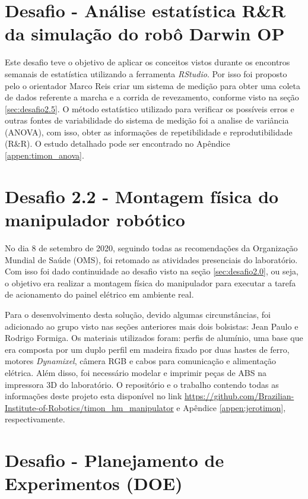 \section{Desafio - Análise estatística R\&R da simulação do robô Darwin OP}
\label{sec:estudo_estatisticoRR}

Este desafio teve o objetivo de aplicar os conceitos vistos durante os encontros semanais de estatística utilizando a ferramenta \textit{RStudio}. Por isso foi proposto pelo o orientador Marco Reis criar um sistema de medição para obter uma coleta de dados referente a marcha e a corrida de revezamento, conforme visto na seção \ref{sec:desafio2.5}. O método estatístico utilizado para verificar os possíveis erros e outras fontes de variabilidade do sistema de medição foi a analise de variância (ANOVA), com isso, obter as informações de repetibilidade e reprodutibilidade (R\&R). O estudo detalhado pode ser encontrado no Apêndice \ref{appen:timon_anova}. 


\section{Desafio 2.2 - Montagem física do manipulador robótico}
\label{sec:desafio2.2}

No dia 8 de setembro de 2020, seguindo todas as recomendações da Organização Mundial de Saúde (OMS), foi retomado as atividades presenciais do laboratório. Com isso foi dado continuidade ao desafio visto na seção \ref{sec:desafio2.0}, ou seja, o objetivo era realizar a montagem física do manipulador para executar a tarefa de acionamento do painel elétrico em ambiente real.

Para o desenvolvimento desta solução, devido algumas circunstâncias, foi adicionado ao grupo visto nas seções anteriores mais dois bolsistas: Jean Paulo e Rodrigo Formiga. Os materiais utilizados foram: perfis de alumínio, uma base que era composta por um duplo perfil em madeira fixado por duas hastes de ferro, motores \textit{Dynamixel}, câmera RGB e cabos para comunicação e alimentação elétrica. Além disso, foi necessário modelar e imprimir peças de ABS na impressora 3D do laboratório. O repositório e o trabalho contendo todas as informações deste projeto esta disponível no link \url{https://github.com/Brazilian-Institute-of-Robotics/timon_hm_manipulator} e Apêndice \ref{appen:jerotimon}, respectivamente.

\section{Desafio - Planejamento de Experimentos (DOE)}
\label{sec:DOE}

